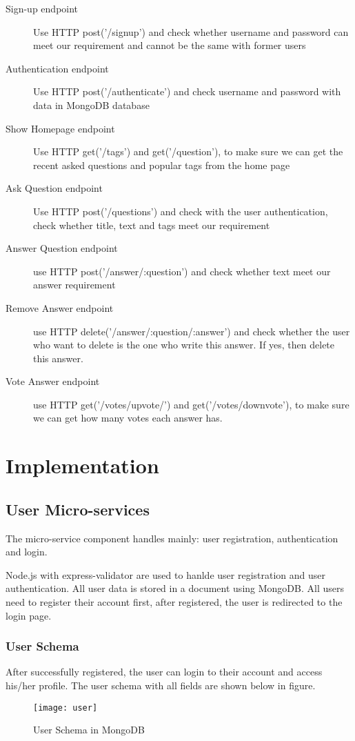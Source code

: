 \documentclass[11pt]{article}
\begin{document}
\begin{description}
  \item[Sign-up endpoint]  Use HTTP post('/signup') and check whether username and password can meet our requirement and cannot be the same with former users
  \item[Authentication endpoint] Use HTTP post('/authenticate') and check username and password with data in MongoDB database
  \item[Show Homepage endpoint] Use HTTP get('/tags') and get('/question'), to make sure we can get the recent asked questions and popular tags from the home page
  \item [Ask Question endpoint] Use HTTP post('/questions') and check with the user authentication, check whether title, text and tags meet our requirement
  \item [Answer Question endpoint]  use HTTP post('/answer/:question') and check whether text meet our answer requirement
  \item [Remove Answer endpoint] use HTTP delete('/answer/:question/:answer') and check whether the user who want to delete is the one who write this answer. If yes, then delete this answer. 
  \item [Vote Answer endpoint] use HTTP get('/votes/upvote/') and get('/votes/downvote'), to make sure we can get how many votes each answer has. 
\end{description} 

\newpage
\section{Implementation}

\subsection{User Micro-services}
The micro-service component handles mainly: user registration, authentication and login. 

Node.js with express-validator are used to hanlde user registration and user authentication. All user data is stored in a document using MongoDB. All users need to register their account first, after registered, the user is redirected to the login page. 

\subsubsection{User Schema}
After successfully registered, the user can login to their account and access his/her profile. The user schema with all fields are shown below in figure. 
\begin{figure}[htp]
    \centering
    \texttt{[image: user]}
    \caption{User Schema in MongoDB}
    \label{fig:galaxy}
\end{figure}
\end{document}
